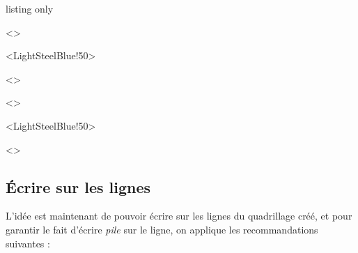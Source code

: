 \documentclass[a4paper]{article}
\begin{document}
\medskip

\begin{PresentationCode}{listing only}

\begin{EnvQuadrillage}[NbCarreaux=18x4,Grille=Seyes,Marge=3]<\CoulSeyes>
\end{EnvQuadrillage}

\begin{EnvQuadrillage}[NbCarreaux=36x8,Elargir=3/3]<LightSteelBlue!50>
\end{EnvQuadrillage}

\begin{center}
	\begin{EnvQuadrillage}[NbCarreaux=12x3,Elargir=2/2,Grille=Ruled,Marge=2]<\CoulRuled>
	\end{EnvQuadrillage}
\end{center}
\end{PresentationCode}

\medskip

\begin{EnvQuadrillage}[NbCarreaux=18x4,Grille=Seyes,Marge=3]<\CoulSeyes>
\end{EnvQuadrillage}

\smallskip

\begin{EnvQuadrillage}[NbCarreaux=36x8,Elargir=3/3,Cadre]<LightSteelBlue!50>
\end{EnvQuadrillage}

\begin{center}
	\begin{EnvQuadrillage}[NbCarreaux=12x3,Grille=Ruled,Marge=2]<\CoulRuled>
\end{EnvQuadrillage}
\end{center}

\pagebreak

\subsection{Écrire sur les lignes}

L'idée est maintenant de pouvoir écrire sur les lignes du quadrillage créé, et pour garantir le fait d'écrire \textit{pile} sur le ligne, on applique les recommandations suivantes :
\end{document}
